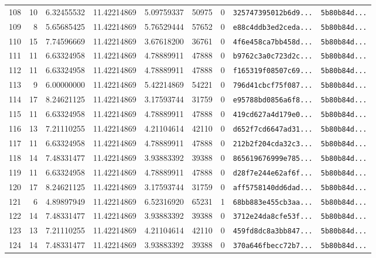 \documentclass[10pt]{article}
\begin{document}
\begin{longtable}{rrrrrrrll}
  108 & 10 & 6.32455532 & 11.42214869 & 5.09759337 & 50975 & 0 & \texttt{325747395012b6d9...} & \texttt{5b80b84d...} \\
  109 & 8 & 5.65685425 & 11.42214869 & 5.76529444 & 57652 & 0 & \texttt{e88c4ddb3ed2ceda...} & \texttt{5b80b84d...} \\
  110 & 15 & 7.74596669 & 11.42214869 & 3.67618200 & 36761 & 0 & \texttt{4f6e458ca7bb458d...} & \texttt{5b80b84d...} \\
  111 & 11 & 6.63324958 & 11.42214869 & 4.78889911 & 47888 & 0 & \texttt{b9762c3a0c723d2c...} & \texttt{5b80b84d...} \\
  112 & 11 & 6.63324958 & 11.42214869 & 4.78889911 & 47888 & 0 & \texttt{f165319f08507c69...} & \texttt{5b80b84d...} \\
  113 & 9 & 6.00000000 & 11.42214869 & 5.42214869 & 54221 & 0 & \texttt{796d41cbcf75f087...} & \texttt{5b80b84d...} \\
  114 & 17 & 8.24621125 & 11.42214869 & 3.17593744 & 31759 & 0 & \texttt{e95788bd0856a6f8...} & \texttt{5b80b84d...} \\
  115 & 11 & 6.63324958 & 11.42214869 & 4.78889911 & 47888 & 0 & \texttt{419cd627a4d179e0...} & \texttt{5b80b84d...} \\
  116 & 13 & 7.21110255 & 11.42214869 & 4.21104614 & 42110 & 0 & \texttt{d652f7cd6647ad31...} & \texttt{5b80b84d...} \\
  117 & 11 & 6.63324958 & 11.42214869 & 4.78889911 & 47888 & 0 & \texttt{212b2f204cda32c3...} & \texttt{5b80b84d...} \\
  118 & 14 & 7.48331477 & 11.42214869 & 3.93883392 & 39388 & 0 & \texttt{865619676999e785...} & \texttt{5b80b84d...} \\
  119 & 11 & 6.63324958 & 11.42214869 & 4.78889911 & 47888 & 0 & \texttt{d28f7e244e62af6f...} & \texttt{5b80b84d...} \\
  120 & 17 & 8.24621125 & 11.42214869 & 3.17593744 & 31759 & 0 & \texttt{aff5758140dd6dad...} & \texttt{5b80b84d...} \\
  \rowcolor{cmpink!20} 121 & 6 & 4.89897949 & 11.42214869 & 6.52316920 & 65231 & 1 & \texttt{68bb883e455cb3aa...} & \texttt{5b80b84d...} \\
  122 & 14 & 7.48331477 & 11.42214869 & 3.93883392 & 39388 & 0 & \texttt{3712e24da8cfe53f...} & \texttt{5b80b84d...} \\
  123 & 13 & 7.21110255 & 11.42214869 & 4.21104614 & 42110 & 0 & \texttt{459fd8dc8a3bb847...} & \texttt{5b80b84d...} \\
  124 & 14 & 7.48331477 & 11.42214869 & 3.93883392 & 39388 & 0 & \texttt{370a646fbecc72b7...} & \texttt{5b80b84d...} \\

\end{longtable}
\end{document}
